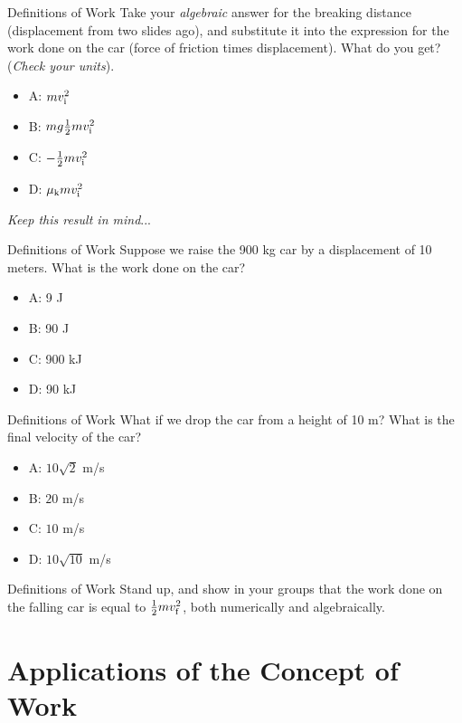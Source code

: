 \documentclass{beamer}
\begin{document}
\begin{frame}{Definitions of Work}
Take your \textit{algebraic} answer for the breaking distance (displacement from two slides ago), and substitute it into the expression for the work done on the car (force of friction times displacement).  What do you get?  (\textit{Check your units}).
\begin{itemize}
\item A: $m v_{\rm i}^2$
\item B: $m g \frac{1}{2} m v_{\rm i}^2$
\item C: $-\frac{1}{2} m v_{\rm i}^2$
\item D: $\mu_{\rm k} m v_{\rm i}^2$
\end{itemize}
\textit{Keep this result in mind}...
\end{frame}

\begin{frame}{Definitions of Work}
Suppose we raise the 900 kg car by a displacement of 10 meters.  What is the work done on the car?
\begin{itemize}
\item A: 9 J
\item B: 90 J
\item C: 900 kJ
\item D: 90 kJ
\end{itemize}
\end{frame}

\begin{frame}{Definitions of Work}
What if we drop the car from a height of 10 m?  What is the final velocity of the car?
\begin{itemize}
\item A: $10\sqrt{2}$ m/s
\item B: $20$ m/s
\item C: $10$ m/s
\item D: $10\sqrt{10}$ m/s
\end{itemize}
\end{frame}

\begin{frame}{Definitions of Work}
Stand up, and show in your groups that the work done on the falling car is equal to $\frac{1}{2}m v_{\rm f}^2$, both numerically and algebraically.
\end{frame}

\section{Applications of the Concept of Work}
\end{document}
